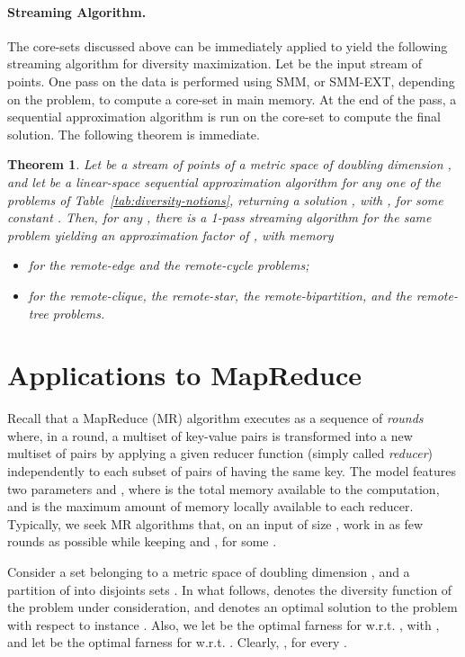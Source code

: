 \documentclass{article}
\newtheorem{theorem}{Theorem}
\begin{document}
\paragraph{Streaming Algorithm.}  The core-sets discussed above
can be immediately applied to yield the following streaming algorithm
for diversity maximization.  Let  be the input stream of  points.
One pass on the data is performed using  {\sc SMM}, or
{\sc SMM-EXT}, depending on the problem, to compute a core-set 
in main memory. At the end of the pass, a sequential
approximation algorithm is run on the core-set to compute the final solution.
The following theorem is immediate.
\begin{theorem} \label{thm:streaming-1-pass} 
Let  be a stream of  points of
  a metric space of doubling dimension , and let  be a
  linear-space sequential approximation algorithm for any one of the
  problems of Table~\ref{tab:diversity-notions}, returning a solution
  , with ,
  for some constant . Then, for any ,
  there is a 1-pass streaming algorithm for the same problem yielding an
  approximation factor of , with memory
  \begin{itemize}
  \item  for the remote-edge
    and the remote-cycle problems;
  \item  for the remote-clique,
    the remote-star, the remote-bipartition, and the remote-tree
    problems.
  \end{itemize}
\end{theorem}

\section{Applications to MapReduce}
\label{sec:mapreduce}

Recall that a MapReduce (MR) algorithm \cite{KarloffSV10,
  PietracaprinaPRSU12} executes as a sequence of \emph{rounds} where,
in a round, a multiset  of key-value pairs is transformed into a
new multiset  of pairs by applying a given reducer function (simply
called \emph{reducer}) independently to each subset of pairs of 
having the same key. The model features two parameters  and
, where  is the total memory available to the computation,
and  is the maximum amount of memory locally available to each
reducer. Typically, we seek MR algorithms that, on an input of size
, work in as few rounds as possible while keeping  and
, for some .
 
Consider a set  belonging to a metric space of doubling dimension
, and a partition of  into  disjoints sets
 . In what follows, 
denotes the diversity function of the problem under consideration, and
 denotes an optimal solution to the problem with respect to
instance . Also, we let  be the
optimal farness for  w.r.t. , with , and let
 be the optimal farness for  w.r.t. .  Clearly,
, for every .
\end{document}
